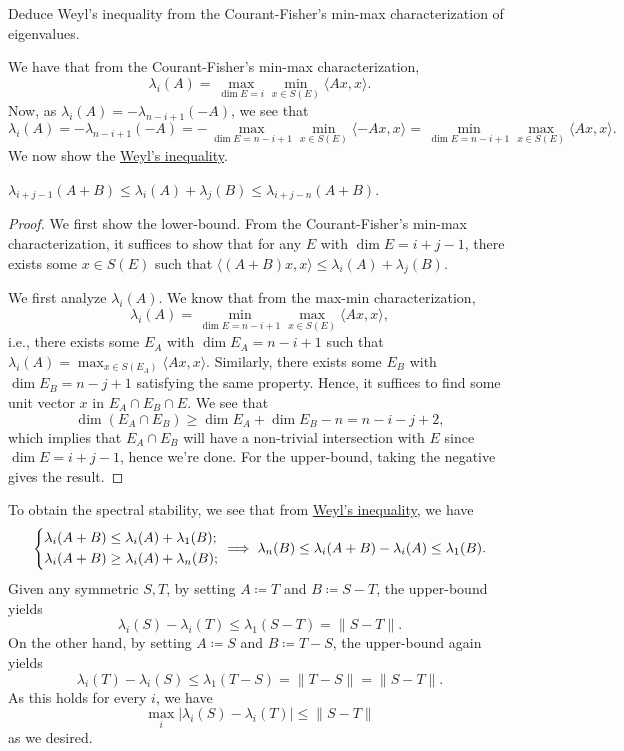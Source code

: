 \begin{problem*}[Exercise 4.5.4]\label{ex4.5.4}
	Deduce Weyl's inequality from the Courant-Fisher's min-max characterization of eigenvalues.
\end{problem*}
\begin{answer}
	We have that from the Courant-Fisher's min-max characterization,
	\[
		\lambda _i (A)
		= \max _{\dim E = i} \min _{x \in S(E)} \langle Ax, x \rangle .
	\]
	Now, as \(\lambda _i (A) = - \lambda _{n-i+1} (-A)\), we see that
	\[
		\lambda _i(A)
		= - \lambda _{n-i+1}(-A)
		= - \max _{\dim E = n-i+1} \min _{x \in S(E)} \langle -Ax, x \rangle
		= \min _{\dim E = n-i+1} \max _{x \in S(E)} \langle Ax, x \rangle.
	\]
	We now show the \hyperref[thm:Weyl-inequality]{Weyl's inequality}.

	\begin{theorem}\label{thm:Weyl-inequality}
		\(\lambda _{i+j-1}(A+B) \leq \lambda _i(A) + \lambda _j(B) \leq \lambda _{i+j-n}(A+B)\).
	\end{theorem}
	\begin{proof}
		We first show the lower-bound. From the Courant-Fisher's min-max characterization, it suffices to show that for any \(E\) with \(\dim E = i+j-1\), there exists some \(x \in S(E)\) such that \(\langle (A+B)x, x \rangle \leq \lambda _i(A) + \lambda _j(B)\).

		We first analyze \(\lambda _i(A)\). We know that from the max-min characterization,
		\[
			\lambda _i(A)
			= \min _{\dim E = n-i+1} \max _{x \in S(E)} \langle Ax, x \rangle ,
		\]
		i.e., there exists some \(E_A\) with \(\dim E_A = n-i+1\) such that \(\lambda _i(A) = \max _{x \in S(E_A)} \langle Ax, x \rangle \). Similarly, there exists some \(E_B\) with \(\dim E_B = n-j+1\) satisfying the same property. Hence, it suffices to find some unit vector \(x\) in \(E_A \cap E_B \cap E\). We see that
		\[
			\dim (E_A \cap E_B)
			\geq \dim E_A + \dim E_B - n
			= n-i-j+2,
		\]
		which implies that \(E_A \cap E_B\) will have a non-trivial intersection with \(E\) since \(\dim E = i+j-1\), hence we're done. For the upper-bound, taking the negative gives the result.
	\end{proof}

	To obtain the spectral stability, we see that from \hyperref[thm:Weyl-inequality]{Weyl's inequality}, we have
	\[
		\begin{dcases}
			\lambda _i(A+B) \leq \lambda _i(A) + \lambda _1(B) ; \\
			\lambda _i(A+B) \geq \lambda _i(A) + \lambda _n(B) ;
		\end{dcases}
		\implies \lambda _n(B) \leq \lambda _i(A+B) - \lambda _i(A) \leq \lambda _1(B).
	\]
	Given any symmetric \(S, T\), by setting \(A \coloneqq T\) and \(B \coloneqq S - T\), the upper-bound yields
	\[
		\lambda _i(S) - \lambda _i(T)
		\leq \lambda _1(S - T)
		= \lVert S - T \rVert.
	\]
	On the other hand, by setting \(A \coloneqq S\) and \(B\coloneqq T - S\), the upper-bound again yields
	\[
		\lambda _i(T) - \lambda _i(S)
		\leq \lambda _1(T - S)
		= \lVert T - S \rVert
		= \lVert S - T \rVert.
	\]
	As this holds for every \(i\), we have
	\[
		\max _i \lvert \lambda _i(S) - \lambda _i(T) \rvert
		\leq \lVert S - T \rVert
	\]
	as we desired.
\end{answer}